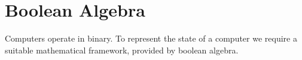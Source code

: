 \section{Boolean Algebra}
Computers operate in binary. To represent the state of a
computer we require a suitable mathematical framework,
provided by boolean algebra.